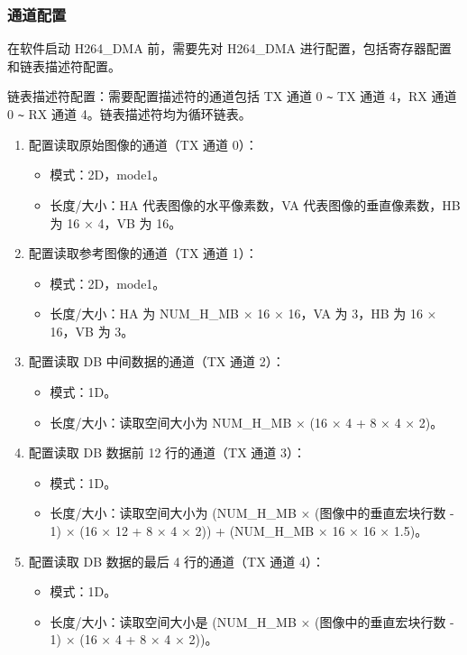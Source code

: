 \documentclass[main\_\_CN.tex]{subfiles}
\begin{document}
\subsubsection{通道配置}\label{sec:h264-dma-ch-cfg}
在软件启动 H264\_DMA 前，需要先对 H264\_DMA 进行配置，包括寄存器配置和链表描述符配置。

链表描述符配置：需要配置描述符的通道包括 TX 通道 0 \verb+~+ TX 通道 4，RX 通道 0 \verb+~+ RX 通道 4。链表描述符均为循环链表。
\begin{enumerate}
    \item 配置读取原始图像的通道（TX 通道 0）：
    \begin{itemize}
        \item 模式：2D，mode1。
        \item 长度/大小：HA 代表图像的水平像素数，VA 代表图像的垂直像素数，HB 为 16 × 4，VB 为 16。
    \end{itemize}
    \item 配置读取参考图像的通道（TX 通道 1）：
    \begin{itemize}
        \item 模式：2D，mode1。
        \item 长度/大小：HA 为 NUM\_H\_MB × 16 × 16，VA 为 3，HB 为 16 × 16，VB 为 3。
    \end{itemize}
    \item 配置读取 DB 中间数据的通道（TX 通道 2）：
    \begin{itemize}
        \item 模式：1D。
        \item 长度/大小：读取空间大小为 NUM\_H\_MB × (16 × 4 + 8 × 4 × 2)。
    \end{itemize}
    \item 配置读取 DB 数据前 12 行的通道（TX 通道 3）：
    \begin{itemize}
        \item 模式：1D。
        \item 长度/大小：读取空间大小为 (NUM\_H\_MB × (图像中的垂直宏块行数 - 1) × (16 × 12 + 8 × 4 × 2)) + (NUM\_H\_MB × 16 × 16 × 1.5)。
    \end{itemize}
    \item 配置读取 DB 数据的最后 4 行的通道（TX 通道 4）：
    \begin{itemize}
        \item 模式：1D。
        \item 长度/大小：读取空间大小是 (NUM\_H\_MB × (图像中的垂直宏块行数 - 1) × (16 × 4 + 8 × 4 × 2))。
    \end{itemize}

\end{enumerate}
\end{document}
